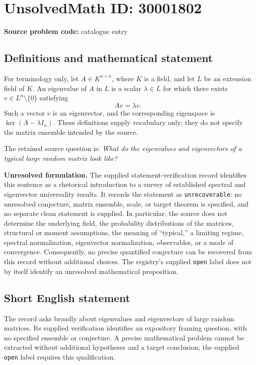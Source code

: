 \documentclass[11pt]{article}
\begin{document}
\section*{UnsolvedMath ID: 30001802}
\textbf{Source problem code:} catalogue entry
\subsection{Definitions and mathematical statement}
For terminology only, let \(A\in K^{n\times n}\), where \(K\) is a field, and let \(L\) be an extension field of \(K\). An eigenvalue of \(A\) in \(L\) is a scalar \(\lambda\in L\) for which there exists \(v\in L^n\setminus\{0\}\) satisfying
\[
Av=\lambda v.
\]
Such a vector \(v\) is an eigenvector, and the corresponding eigenspace is \(\ker(A-\lambda I_n)\). These definitions supply vocabulary only; they do not specify the matrix ensemble intended by the source.

The retained source question is: \emph{What do the eigenvalues and eigenvectors of a typical large random matrix look like?}

\textbf{Unresolved formulation.} The supplied statement-verification record identifies this sentence as a rhetorical introduction to a survey of established spectral and eigenvector universality results. It records the statement as \texttt{unrecoverable}: no unresolved conjecture, matrix ensemble, scale, or target theorem is specified, and no separate clean statement is supplied. In particular, the source does not determine the underlying field, the probability distributions of the matrices, structural or moment assumptions, the meaning of ``typical,'' a limiting regime, spectral normalization, eigenvector normalization, observables, or a mode of convergence. Consequently, no precise quantified conjecture can be recovered from this record without additional choices. The registry's supplied \texttt{open} label does not by itself identify an unresolved mathematical proposition.
\subsection{Short English statement}
The record asks broadly about eigenvalues and eigenvectors of large random matrices. Its supplied verification identifies an expository framing question, with no specified ensemble or conjecture. A precise mathematical problem cannot be extracted without additional hypotheses and a target conclusion; the supplied \texttt{open} label requires this qualification.
\end{document}
